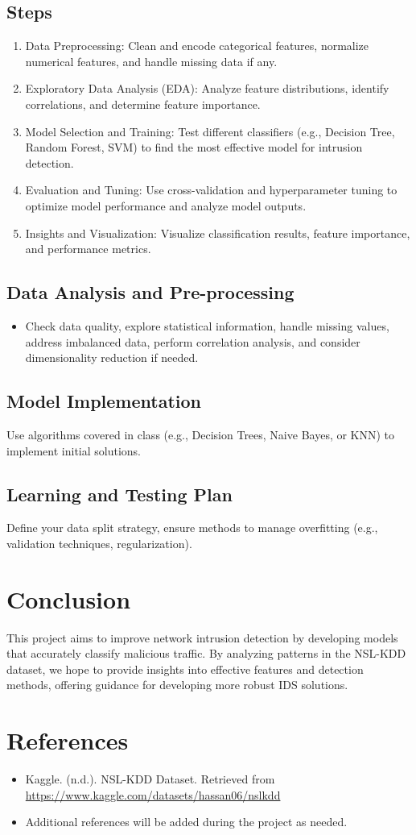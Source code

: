 \documentclass[a4paper,12pt]{article}
\begin{document}
\subsection{Steps}
\begin{enumerate}
    \item Data Preprocessing: Clean and encode categorical features, normalize numerical features, and handle missing data if any.
    \item Exploratory Data Analysis (EDA): Analyze feature distributions, identify correlations, and determine feature importance.
    \item Model Selection and Training: Test different classifiers (e.g., Decision Tree, Random Forest, SVM) to find the most effective model for intrusion detection.
    \item Evaluation and Tuning: Use cross-validation and hyperparameter tuning to optimize model performance and analyze model outputs.
    \item Insights and Visualization: Visualize classification results, feature importance, and performance metrics.
\end{enumerate}

\subsection{Data Analysis and Pre-processing}
\begin{itemize}
    \item Check data quality, explore statistical information, handle missing values, address imbalanced data, perform correlation analysis, and consider dimensionality reduction if needed.
\end{itemize}

\subsection{Model Implementation}
Use algorithms covered in class (e.g., Decision Trees, Naive Bayes, or KNN) to implement initial solutions.

\subsection{Learning and Testing Plan}
Define your data split strategy, ensure methods to manage overfitting (e.g., validation techniques, regularization).

\section{Conclusion}
This project aims to improve network intrusion detection by developing models that accurately classify malicious traffic. By analyzing patterns in the NSL-KDD dataset, we hope to provide insights into effective features and detection methods, offering guidance for developing more robust IDS solutions.

\section{References}
\begin{itemize}
    \item Kaggle. (n.d.). NSL-KDD Dataset. Retrieved from \url{https://www.kaggle.com/datasets/hassan06/nslkdd}
    \item Additional references will be added during the project as needed.
\end{itemize}
\end{document}
